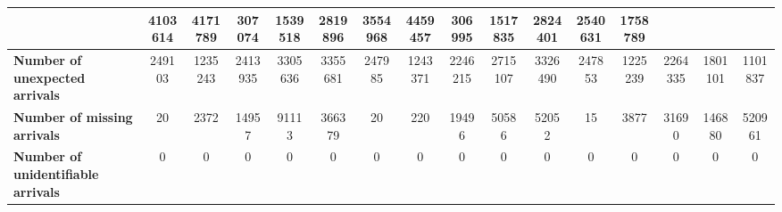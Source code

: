 \begin{table}[!h]
{\begin{tabular}{|l|ccccc|ccccc|ccccc|}
            & \multicolumn{1}{c|}{4103614}
            & \multicolumn{1}{c|}{4171789}
            & \multicolumn{1}{c|}{307074}
            & \multicolumn{1}{c|}{1539518}
            & \multicolumn{1}{c|}{2819896}
            & \multicolumn{1}{c|}{3554968}
            & \multicolumn{1}{c|}{4459457}
            & \multicolumn{1}{c|}{306995}
            & \multicolumn{1}{c|}{1517835}
            & \multicolumn{1}{c|}{2824401}
            & \multicolumn{1}{c|}{2540631}
            & \multicolumn{1}{c|}{1758789}
            \\ \hline
            \textbf{Number of unexpected arrivals} & \multicolumn{1}{c|}{249103} & \multicolumn{1}{c|}{1235243}
            & \multicolumn{1}{c|}{2413935}
            & \multicolumn{1}{c|}{3305636}
            & \multicolumn{1}{c|}{3355681}
            & \multicolumn{1}{c|}{247985}
            & \multicolumn{1}{c|}{1243371}
            & \multicolumn{1}{c|}{2246215}
            & \multicolumn{1}{c|}{2715107}
            & \multicolumn{1}{c|}{3326490}
            & \multicolumn{1}{c|}{247853}
            & \multicolumn{1}{c|}{1225239}
            & \multicolumn{1}{c|}{2264335}
            & \multicolumn{1}{c|}{1801101}
            & \multicolumn{1}{c|}{1101837}
            \\ \hline
            \textbf{Number of missing arrivals} & \multicolumn{1}{c|}{20} & \multicolumn{1}{c|}{2372}
            & \multicolumn{1}{c|}{14957}
            & \multicolumn{1}{c|}{91113}
            & \multicolumn{1}{c|}{366379}
            & \multicolumn{1}{c|}{20}
            & \multicolumn{1}{c|}{220}
            & \multicolumn{1}{c|}{19496}
            & \multicolumn{1}{c|}{50586}
            & \multicolumn{1}{c|}{52052}
            & \multicolumn{1}{c|}{15}
            & \multicolumn{1}{c|}{3877}
            & \multicolumn{1}{c|}{31690}
            & \multicolumn{1}{c|}{146880}
            & \multicolumn{1}{c|}{520961}
            \\ \hline
            \textbf{Number of unidentifiable arrivals} & \multicolumn{1}{c|}{0} & \multicolumn{1}{c|}{0}
            & \multicolumn{1}{c|}{0}
            & \multicolumn{1}{c|}{0}
            & \multicolumn{1}{c|}{0}
            & \multicolumn{1}{c|}{0}
            & \multicolumn{1}{c|}{0}
            & \multicolumn{1}{c|}{0}
            & \multicolumn{1}{c|}{0}
            & \multicolumn{1}{c|}{0}
            & \multicolumn{1}{c|}{0}
            & \multicolumn{1}{c|}{0}
            & \multicolumn{1}{c|}{0}
            & \multicolumn{1}{c|}{0}
            & \multicolumn{1}{c|}{0}
            \\ \hline

\end{tabular}}
\end{table}
